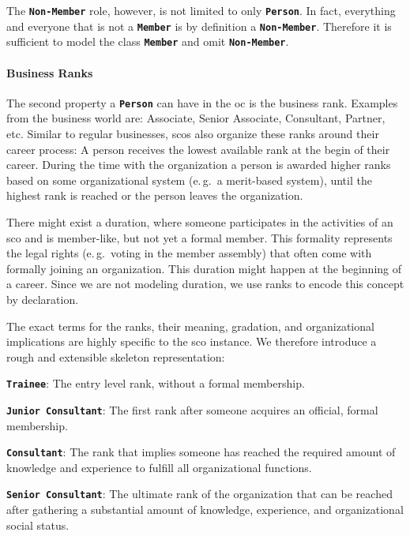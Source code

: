 \documentclass[a4paper, DIV=13, BCOR=0cm]{scrbook}
\newcommand{\eg}{e.\,g.\ }
\newcommand{\class}[1]{\texttt{\textbf{#1}}}
\begin{document}
The \class{Non-Member} role, however, is not limited to only \class{Person}. In fact, everything and everyone that is not a \class{Member} is by definition a \class{Non-Member}. Therefore it is sufficient to model the class \class{Member} and omit \class{Non-Member}.

\paragraph{Business Ranks}
\label{ranks}
The second property a \class{Person} can have in the \gls{oc} is the business rank. Examples from the business world are: Associate, Senior Associate, Consultant, Partner, etc. Similar to regular businesses, \glspl{sco} also organize these ranks around their career process: A person receives the lowest available rank at the begin of their career. During the time with the organization a person is awarded higher ranks based on some organizational system (\eg a merit-based system), until the highest rank is reached or the person leaves the organization.

There might exist a duration, where someone participates in the activities of an \gls{sco} and is member-like, but not yet a formal member. This formality represents the legal rights (\eg voting in the member assembly) that often come with formally joining an organization. This duration might happen at the beginning of a career. Since we are not modeling duration, we use ranks to encode this concept by declaration.

The exact terms for the ranks, their meaning, gradation, and organizational implications are highly specific to the \gls{sco} instance. We therefore introduce a rough and extensible skeleton representation:
\begin{compactenum}
	\item \class{Trainee}: The entry level rank, without a formal membership.
	\item \class{Junior Consultant}: The first rank after someone acquires an official, formal membership.
	\item \class{Consultant}: The rank that implies someone has reached the required amount of knowledge and experience to fulfill all organizational functions.
	\item \class{Senior Consultant}: The ultimate rank of the organization that can be reached after gathering a substantial amount of knowledge, experience, and organizational social status.
\end{compactenum}
\end{document}
